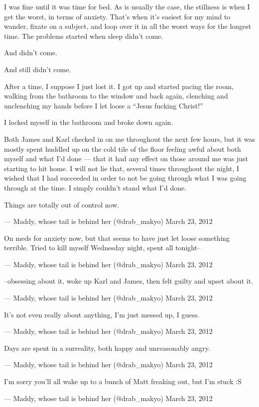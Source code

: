 I was fine until it was time for bed. As is usually the case, the stillness is when I get the worst, in terms of anxiety. That's when it's easiest for my mind to wander, fixate on a subject, and loop over it in all the worst ways for the longest time. The problems started when sleep didn't come.

And didn't come.

And still didn't come.

After a time, I suppose I just lost it. I got up and started pacing the room, walking from the bathroom to the window and back again, clenching and unclenching my hands before I let loose a ``Jesus fucking Christ!''

I locked myself in the bathroom and broke down again.

Both James and Karl checked in on me throughout the next few hours, but it was mostly spent huddled up on the cold tile of the floor feeling awful about both myself and what I'd done --- that it had any effect on those around me was just starting to hit home. I will not lie that, several times throughout the night, I wished that I had succeeded in order to not be going through what I was going through at the time. I simply couldn't stand what I'd done.
\newpage

Things are totally out of control now.

--- Maddy, whose tail is behind her (@drab\_makyo) March 23, 2012

On meds for anxiety now, but that seems to have just let loose something terrible. Tried to kill myself Wednesday night, spent all tonight--

--- Maddy, whose tail is behind her (@drab\_makyo) March 23, 2012

--obsessing about it, woke up Karl and James, then felt guilty and upset about it.

--- Maddy, whose tail is behind her (@drab\_makyo) March 23, 2012

It's not even really about anything, I'm just messed up, I guess.

--- Maddy, whose tail is behind her (@drab\_makyo) March 23, 2012

Days are spent in a surreality, both happy and unreasonably angry.

--- Maddy, whose tail is behind her (@drab\_makyo) March 23, 2012

I'm sorry you'll all wake up to a bunch of Matt freaking out, but I'm stuck :S

--- Maddy, whose tail is behind her (@drab\_makyo) March 23, 2012

